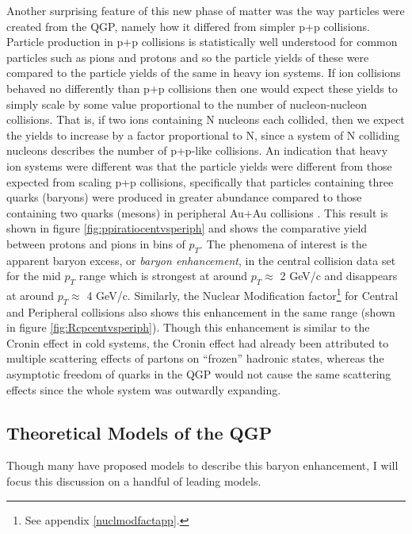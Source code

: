 Another surprising feature of this new phase of matter was the way particles were created from the QGP, namely how it differed from simpler p+p collisions. Particle production in p+p collisions is statistically well understood for common particles such as pions and protons and so the particle yields of these were compared to the particle yields of the same in heavy ion systems. If ion collisions behaved no differently than p+p collisions then one would expect these yields to simply scale by some value proportional to the number of nucleon-nucleon collisions. That is, if two ions containing N nucleons each collided, then we expect the yields to increase by a factor proportional to N, since a system of N colliding nucleons describes the number of p+p-like collisions. An indication that heavy ion systems were different was that the particle yields were different from those expected from scaling p+p collisions, specifically that particles containing three quarks (baryons) were produced in greater abundance compared to those containing two quarks (mesons) in peripheral Au+Au collisions \citep{PhysRevLett.97.152301}. This result is shown in figure \ref{fig:ppiratiocentvsperiph} and shows the comparative yield between protons and pions in bins of $p_{T}$. The phenomena of interest is the apparent baryon excess, or \textit{baryon enhancement}, in the central collision data set for the mid $p_{T}$ range which is strongest at around $p_{T}\approx$ 2 GeV/c and disappears at around $p_{T}\approx$ 4 GeV/c. Similarly, the Nuclear Modification factor\footnote{See appendix \ref{nuclmodfactapp}.} for Central and Peripheral collisions also shows this enhancement in the same range (shown in figure \ref{fig:Rcpcentvsperiph}). Though this enhancement is similar to the Cronin effect in cold systems, the Cronin effect had already been attributed to multiple scattering effects of partons on ``frozen'' hadronic states, whereas the asymptotic freedom of quarks in the QGP would not cause the same scattering effects since the whole system was outwardly expanding.

\subsection{Theoretical Models of the QGP}
Though many have proposed models to describe this baryon enhancement, I will focus this discussion on a handful of leading models.

